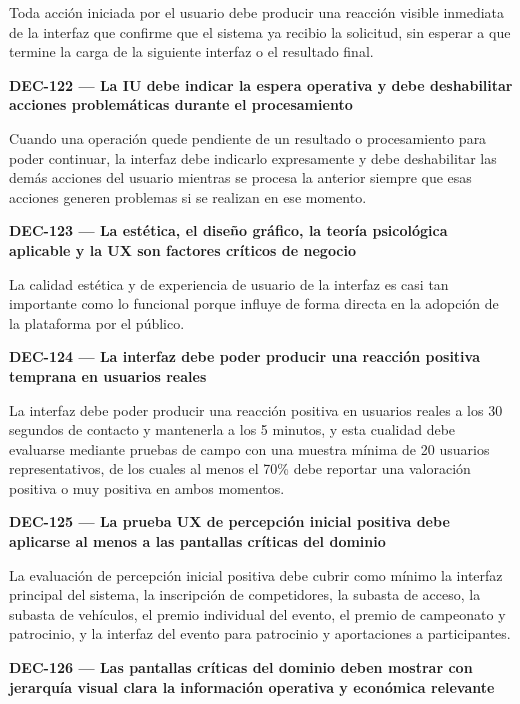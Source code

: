 \documentclass[10pt,letterpaper]{article}
\begin{document}
Toda acción iniciada por el usuario debe producir una reacción visible inmediata de la interfaz que confirme que el sistema ya recibio la solicitud, sin esperar a que termine la carga de la siguiente interfaz o el resultado final.\par\vspace{0.45em}
\noindent\textbf{DEC-122 --- La IU debe indicar la espera operativa y debe deshabilitar acciones problemáticas durante el procesamiento}\par
Cuando una operación quede pendiente de un resultado o procesamiento para poder continuar, la interfaz debe indicarlo expresamente y debe deshabilitar las demás acciones del usuario mientras se procesa la anterior siempre que esas acciones generen problemas si se realizan en ese momento.\par\vspace{0.45em}
\noindent\textbf{DEC-123 --- La estética, el diseño gráfico, la teoría psicológica aplicable y la UX son factores críticos de negocio}\par
La calidad estética y de experiencia de usuario de la interfaz es casi tan importante como lo funcional porque influye de forma directa en la adopción de la plataforma por el público.\par\vspace{0.45em}
\noindent\textbf{DEC-124 --- La interfaz debe poder producir una reacción positiva temprana en usuarios reales}\par
La interfaz debe poder producir una reacción positiva en usuarios reales a los 30 segundos de contacto y mantenerla a los 5 minutos, y esta cualidad debe evaluarse mediante pruebas de campo con una muestra mínima de 20 usuarios representativos, de los cuales al menos el 70\% debe reportar una valoración positiva o muy positiva en ambos momentos.\par\vspace{0.45em}
\noindent\textbf{DEC-125 --- La prueba UX de percepción inicial positiva debe aplicarse al menos a las pantallas críticas del dominio}\par
La evaluación de percepción inicial positiva debe cubrir como mínimo la interfaz principal del sistema, la inscripción de competidores, la subasta de acceso, la subasta de vehículos, el premio individual del evento, el premio de campeonato y patrocinio, y la interfaz del evento para patrocinio y aportaciones a participantes.\par\vspace{0.45em}
\noindent\textbf{DEC-126 --- Las pantallas críticas del dominio deben mostrar con jerarquía visual clara la información operativa y económica relevante}\par
\end{document}
